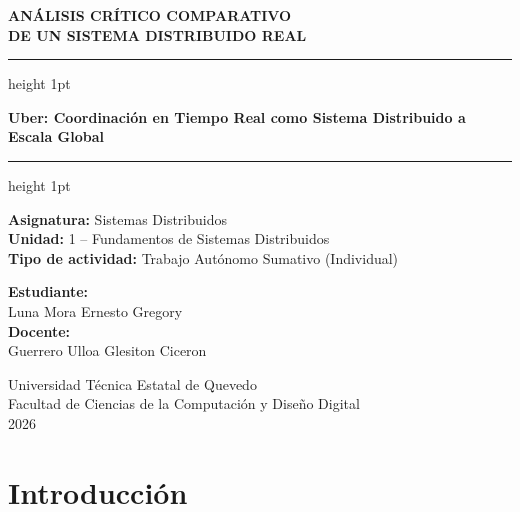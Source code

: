\documentclass[12pt,a4paper]{article}
\begin{document}

\begin{titlepage}
  \centering
  \vspace*{1.5cm}

  {\Large\bfseries ANÁLISIS CRÍTICO COMPARATIVO\\DE UN SISTEMA DISTRIBUIDO REAL\par}

  \vspace{0.8cm}
  \hrule height 1pt
  \vspace{0.5cm}

  {\large\bfseries Uber: Coordinación en Tiempo Real como Sistema Distribuido a Escala Global\par}

  \vspace{0.5cm}
  \hrule height 1pt
  \vspace{1.5cm}

  \textbf{Asignatura:} Sistemas Distribuidos\\[6pt]
  \textbf{Unidad:} 1 -- Fundamentos de Sistemas Distribuidos\\[6pt]
  \textbf{Tipo de actividad:} Trabajo Autónomo Sumativo (Individual)\\

  \vspace{2cm}

  \textbf{Estudiante:}\\[4pt]
  Luna Mora Ernesto Gregory\\[25pt]

  \textbf{Docente:}\\[4pt]
  Guerrero Ulloa Glesiton Ciceron\\

  \vfill

  Universidad Técnica Estatal de Quevedo\\[4pt]
  Facultad de Ciencias de la Computación y Diseño Digital\\[8pt]
  2026

\end{titlepage}

\newpage
\tableofcontents
\newpage

\section{Introducción}
\end{document}

